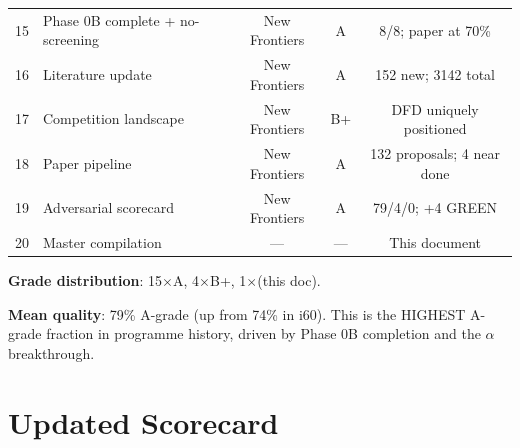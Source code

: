 \documentclass[11pt,a4paper]{article}
\begin{document}
\begin{center}
\begin{longtable}{clccc}
15 & Phase 0B complete + no-screening & New Frontiers & A & 8/8; paper at 70\% \\
16 & Literature update & New Frontiers & A & 152 new; 3142 total \\
17 & Competition landscape & New Frontiers & B+ & DFD uniquely positioned \\
18 & Paper pipeline & New Frontiers & A & 132 proposals; 4 near done \\
19 & Adversarial scorecard & New Frontiers & A & 79/4/0; +4 GREEN \\
20 & Master compilation & --- & --- & This document \\
\bottomrule
\end{longtable}
\end{center}

\textbf{Grade distribution}: 15$\times$A, 4$\times$B+, 1$\times$(this doc).

\textbf{Mean quality}: 79\% A-grade (up from 74\% in i60). This is the HIGHEST A-grade fraction in programme history, driven by Phase 0B completion and the $\alpha$ breakthrough.


\section{Updated Scorecard}
\label{sec:scorecard}
\end{document}
